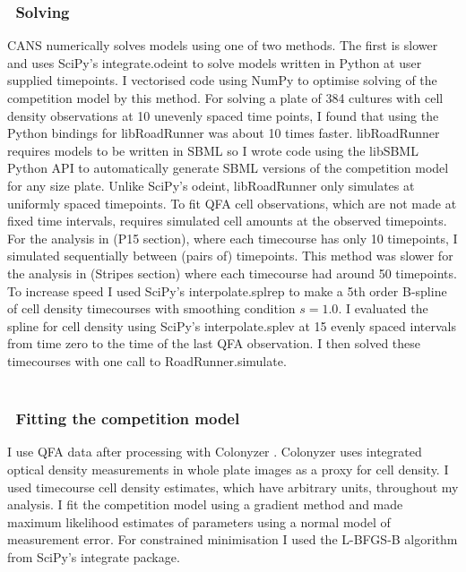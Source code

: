 \subsubsection{\thesubsubsection~Solving}
\label{sec:solving_comp}

CANS numerically solves models using one of two methods. The first is
slower and uses SciPy's integrate.odeint to solve models written in
Python at user supplied timepoints. I vectorised code using NumPy to
optimise solving of the competition model by this method. For solving
a plate of 384 cultures with cell density observations at 10 unevenly
spaced time points, I found that using the Python bindings for
libRoadRunner was about 10 times faster. libRoadRunner requires models
to be written in SBML so I wrote code using the libSBML Python API to
automatically generate SBML versions of the competition model for any
size plate.
Unlike SciPy's odeint, libRoadRunner only simulates at uniformly
spaced timepoints. To fit QFA cell observations, which are not made at
fixed time intervals, requires simulated cell amounts at the observed
timepoints. For the analysis in (P15 section), where each timecourse
has only 10 timepoints, I simulated sequentially between (pairs of)
timepoints. This method was slower for the analysis in (Stripes
section) where each timecourse had around 50 timepoints. To increase
speed I used SciPy's interpolate.splrep to make a 5th order B-spline
of cell density timecourses with smoothing condition \(s=1.0\). I
evaluated the spline for cell density using SciPy's interpolate.splev
at 15 evenly spaced intervals from time zero to the time of the last
QFA observation. I then solved these
timecourses with one call to RoadRunner.simulate.\\\\

\subsubsection{\thesubsubsection~Fitting the competition model}
\label{sec:fitting_comp}

I use QFA data after processing with Colonyzer \citep{Lawless2010}.
Colonyzer uses integrated optical density measurements in whole plate
images as a proxy for cell density. I used timecourse cell density
estimates, which have arbitrary units, throughout my analysis. I fit
the competition model using a gradient method and made maximum
likelihood estimates of parameters using a normal model of measurement
error. For constrained minimisation I used the L-BFGS-B algorithm from
SciPy's integrate package.

